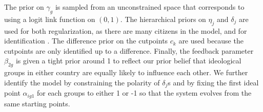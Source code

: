 \documentclass[12pt]{article}
\begin{document}
The prior on $\gamma_g$ is sampled from an unconstrained space that corresponds to using a logit link function on $(0,1)$. The hierarchical priors on $\eta_j$ and $\delta_j$ are used for both regularization, as there are many citizens in the model, and for identification \parencite{gelman2005}. The difference prior on the cutpoints $c_k$ are used because the cutpoints are only identified up to a difference. Finally, the feedback parameter $\beta_{2g}$ is given a tight prior around 1 to reflect our prior belief that ideological groups in either country are equally likely to influence each other. We further identify the model by constraining the polarity of $\delta_j$s and by fixing the first ideal point $\alpha_{ig1}$ for each groups to either 1 or -1 so that the system evolves from the same starting points.

 



\printbibliography
\end{document}
